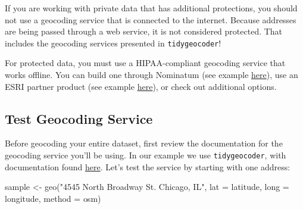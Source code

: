 \documentclass[
  letterpaper,
  DIV=11,
  numbers=noendperiod]{scrreprt}
\newenvironment{Shaded}{\begin{snugshade}}{\end{snugshade}}
\newcommand{\AttributeTok}[1]{\textcolor[rgb]{0.40,0.45,0.13}{#1}}
\newcommand{\FunctionTok}[1]{\textcolor[rgb]{0.28,0.35,0.67}{#1}}
\newcommand{\NormalTok}[1]{\textcolor[rgb]{0.00,0.23,0.31}{#1}}
\newcommand{\OtherTok}[1]{\textcolor[rgb]{0.00,0.23,0.31}{#1}}
\newcommand{\StringTok}[1]{\textcolor[rgb]{0.13,0.47,0.30}{#1}}
\begin{document}
\begin{tcolorbox}[enhanced jigsaw, colframe=quarto-callout-important-color-frame, bottomtitle=1mm, bottomrule=.15mm, colback=white, arc=.35mm, titlerule=0mm, colbacktitle=quarto-callout-important-color!10!white, coltitle=black, title=\textcolor{quarto-callout-important-color}{\faExclamation}\hspace{0.5em}{Is your data private?}, opacitybacktitle=0.6, leftrule=.75mm, breakable, opacityback=0, left=2mm, rightrule=.15mm, toprule=.15mm, toptitle=1mm]

If you are working with private data that has additional protections,
you should not use a geocoding service that is connected to the
internet. Because addresses are being passed through a web service, it
is not considered protected. That includes the geocoding services
presented in \texttt{tidygeocoder}!

For protected data, you must use a HIPAA-compliant geocoding service
that works offline. You can build one through Nominatum (see example
\href{https://mapscaping.com/open\%E2\%80\%91source-geocoding-with-nominatim-and-geopy/}{here}),
use an ESRI partner product (see example
\href{https://www.esri.com/partners/spatialitics-a2Tf20000056o9TEAQ/healthcare-geocoder-a2df2000004MiL4AAK}{here}),
or check out additional options.

\end{tcolorbox}

\subsection{Test Geocoding Service}\label{test-geocoding-service}

Before geocoding your entire dataset, first review the documentation for
the geocoding service you'll be using. In our example we use
\texttt{tidygeocoder}, with documentation found
\href{https://cran.r-project.org/web/packages/tidygeocoder/vignettes/tidygeocoder.html}{here}.
Let's test the service by starting with one address:

\begin{Shaded}
\begin{Highlighting}[]
\NormalTok{sample }\OtherTok{\textless{}{-}} \FunctionTok{geo}\NormalTok{(}\StringTok{"4545 North Broadway St. Chicago, IL"}\NormalTok{, }\AttributeTok{lat =}\NormalTok{ latitude, }\AttributeTok{long =}\NormalTok{ longitude, }\AttributeTok{method =} \StringTok{\textquotesingle{}osm\textquotesingle{}}\NormalTok{)}
\end{Highlighting}
\end{Shaded}
\end{document}
